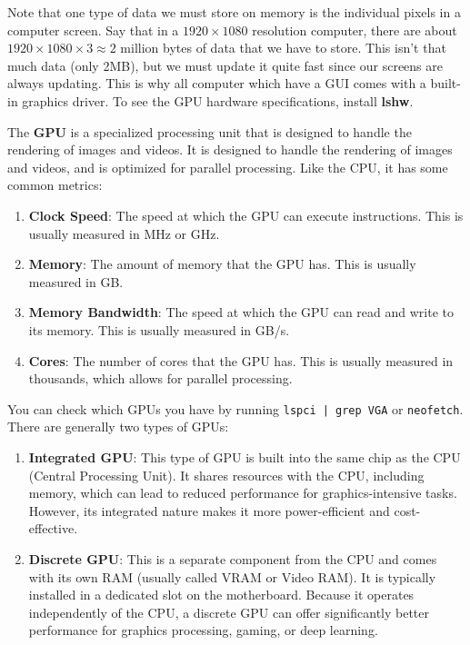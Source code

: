 \documentclass{article}
\begin{document}
    Note that one type of data we must store on memory is the individual pixels in a computer screen. Say that in a $1920 \times 1080$ resolution computer, there are about $1920 \times 1080 \times 3 \approx 2$ million bytes of data that we have to store. This isn't that much data (only 2MB), but we must update it quite fast since our screens are always updating. This is why all computer which have a GUI comes with a built-in graphics driver. To see the GPU hardware specifications, install \textbf{lshw}. 

    \begin{definition}
      The \textbf{GPU} is a specialized processing unit that is designed to handle the rendering of images and videos. It is designed to handle the rendering of images and videos, and is optimized for parallel processing. Like the CPU, it has some common metrics: 
      \begin{enumerate} 
        \item \textbf{Clock Speed}: The speed at which the GPU can execute instructions. This is usually measured in MHz or GHz. 
        \item \textbf{Memory}: The amount of memory that the GPU has. This is usually measured in GB. 
        \item \textbf{Memory Bandwidth}: The speed at which the GPU can read and write to its memory. This is usually measured in GB/s. 
        \item \textbf{Cores}: The number of cores that the GPU has. This is usually measured in thousands, which allows for parallel processing. 
      \end{enumerate}
      You can check which GPUs you have by running \texttt{lspci | grep VGA} or \texttt{neofetch}. There are generally two types of GPUs: 
      \begin{enumerate} 
        \item \textbf{Integrated GPU}: This type of GPU is built into the same chip as the CPU (Central Processing Unit). It shares resources with the CPU, including memory, which can lead to reduced performance for graphics-intensive tasks. However, its integrated nature makes it more power-efficient and cost-effective. 
        \item \textbf{Discrete GPU}: This is a separate component from the CPU and comes with its own RAM (usually called VRAM or Video RAM). It is typically installed in a dedicated slot on the motherboard. Because it operates independently of the CPU, a discrete GPU can offer significantly better performance for graphics processing, gaming, or deep learning. 
      \end{enumerate}
    \end{definition}
\end{document}
